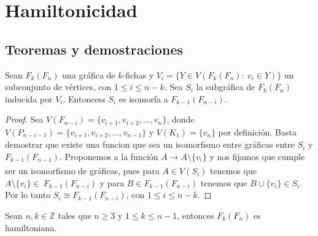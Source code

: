 \chapter{Hamiltonicidad}%
\label{cap:hamilt}

\section{Teoremas y demostraciones}%

\begin{proposicion}
        \label{prop:iso-SFan}
            Sean $F_k(F_n)$ una gr\'afica de $k$-fichas y $V_i=\{ Y \in
            V(F_k(F_n) \colon\ v_i \in Y) \}$ un subconjunto de v\'ertices, con
            $1 \leq i \leq n-k$. Sea $S_i$ la subgr\'afica de $F_k(F_n)$
            inducida  por $V_i$. Entoncess $S_i$ es isomorfa a
            $F_{k-1}(F_{n-i})$.
        \end{proposicion}
    
        \begin{proof}
            Sea $V(F_{n-i}) = \{v_{i+1}, v_{i+2}, \dots, v_n\}$, donde
            $V(P_{n-i-1}) = \{v_{i+1}, v_{i+2}, \dots, v_{n-1}\}$ y $V(K_1)=
            \{v_n\}$ por definici\'on. Basta demostrar que existe una funcion
            que sea un isomorfismo entre gr\'aficas entre $S_i$ y
            $F_{k-1}(F_{n-1})$. Proponemos a la funci\'on $A \xrightarrow[]{} A
            \setminus \{v_i\}$ y nos fijamos que cumple ser un isomorfismo de
            gr\'aficas, pues para $A \in V(S_i)$ tenemos que $A \setminus
            \{v_i\} \in \ F_{k-1}(F_{n-i})$  y para $B \in F_{k-1}(F_{n-i})$
            tenemos que $B \cup \{v_i\} \in S_i$. Por lo tanto $S_i \cong
            F_{k-1}(F_{n-i})$, con $1 \leq i \leq n-k$.
        \end{proof}
    
        \begin{teorema}
        \label{teo:hamilt-SFan}
            Sean $n,k \in \mathbb{Z}$ tales que $n \geq 3$ y $1 \leq k \leq n-1$,
            entonces $F_k(F_n)$ es hamiltoniana.
        \end{teorema}
    
